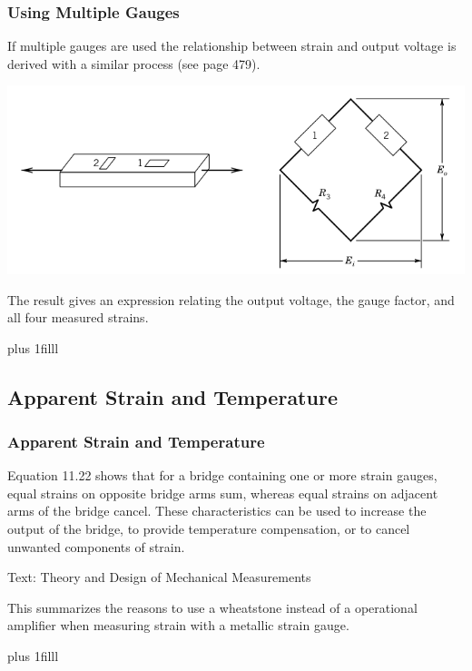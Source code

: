 \documentclass[fleqn]{beamer} %
\newcommand{\sectionIIsubsectionIItitle}{Using Multiple Gauges}
\newcommand{\sectionIIsubsectionIIItitle}{Apparent Strain and Temperature}
\newcommand{\btVFill}{\vskip0pt plus 1filll}
\begin{document}
			\begin{frame}
				\frametitle{\sectionIIsubsectionIItitle} \scriptsize
	
				\bigskip

				\begin{multicols}{2}
If multiple gauges are used the relationship between strain and output voltage is derived with a similar process (see page 479).   \vspcc

\includegraphics[scale=.2]{images/half_bridge_beam.png}
\end{multicols}

The result gives an expression relating the output voltage, the gauge factor, and all four measured strains. \vspcc

\vspcc


				
				\btVFill
			
				
			\end{frame}

		\subsection{\sectionIIsubsectionIIItitle}\label{sectionIIsubsectionIII}

			\begin{frame}
				\frametitle{\sectionIIsubsectionIIItitle} 

				\bigskip

				Equation 11.22 shows that for a bridge containing one or more strain gauges, equal strains on opposite bridge arms sum, whereas equal strains on adjacent arms of the bridge cancel. These characteristics can be used to increase the output of the bridge, to provide temperature compensation, or to cancel unwanted components of strain. \vspc

{\tiny Text: Theory and Design of Mechanical Measurements} \vspcc

This summarizes the reasons to use a wheatstone instead of a operational amplifier when measuring strain with a metallic strain gauge. 

				
				\btVFill
				

			\end{frame}
\end{document}
